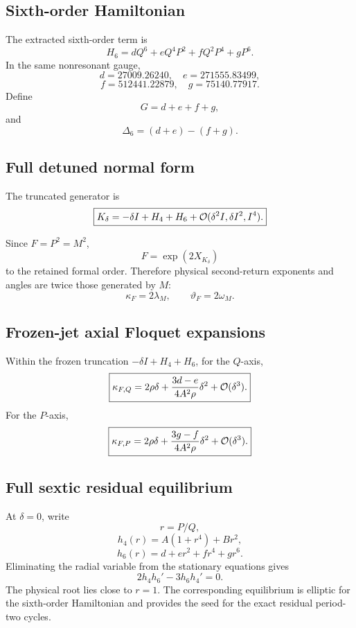 \subsection{Sixth-order Hamiltonian}

The extracted sixth-order term is
\[
\boxed{
H_6
=
dQ^6+eQ^4P^2+fQ^2P^4+gP^6.
}
\]
In the same nonresonant gauge,
\[
d=27009.26240,\quad e=271555.83499,
\]
\[
f=512441.22879,\quad g=75140.77917.
\]
Define
\[
\boxed{
G=d+e+f+g,
}
\]
and
\[
\boxed{
\Delta_6=(d+e)-(f+g).
}
\]

\subsection{Full detuned normal form}

The truncated generator is
\[
\boxed{
K_\delta
=
-\delta I+H_4+H_6+
\mathcal{O}(\delta^2I,\delta I^2,I^4).
}
\]

Since \(F=P^2=M^2\),
\[
\boxed{
F=\exp(2X_{K_\delta})
}
\]
to the retained formal order. Therefore physical second-return exponents and angles are twice those generated by \(M\):
\[
\boxed{
\kappa_F=2\lambda_M,\qquad
\vartheta_F=2\omega_M.
}
\]

\subsection{Frozen-jet axial Floquet expansions}

Within the frozen truncation $-\delta I+H_4+H_6$, for the \(Q\)-axis,
\[
\boxed{
\kappa_{F,Q}
=
2\rho\delta+
\frac{3d-e}{4A^2\rho}\delta^2+
\mathcal{O}(\delta^3).
}
\]
For the \(P\)-axis,
\[
\boxed{
\kappa_{F,P}
=
2\rho\delta+
\frac{3g-f}{4A^2\rho}\delta^2+
\mathcal{O}(\delta^3).
}
\]

\subsection{Full sextic residual equilibrium}

At \(\delta=0\), write
\[
r=P/Q,
\]
\[
h_4(r)=A(1+r^4)+Br^2,
\]
\[
h_6(r)=d+er^2+fr^4+gr^6.
\]
Eliminating the radial variable from the stationary equations gives
\[
\boxed{
2h_4h_6'-3h_6h_4'=0.
}
\]
The physical root lies close to \(r=1\). The corresponding equilibrium is elliptic for the sixth-order Hamiltonian and provides the seed for the exact residual period-two cycles.
